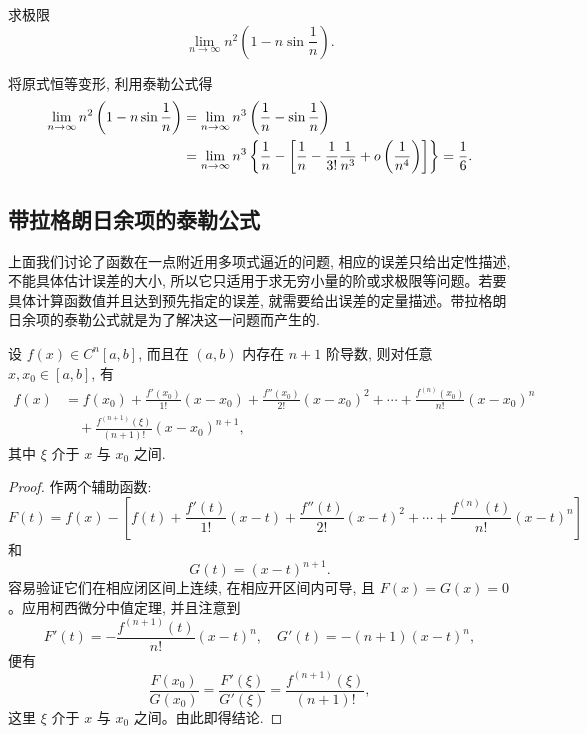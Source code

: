 \begin{example}\label{example:ma-5-3-12}
求极限
\[
  \lim_{n\to\infty}n^2\left(1-n\sin\frac1n\right).
\]
\end{example}


\begin{solve}
将原式恒等变形, 利用泰勒公式得
\[
\begin{aligned}
  \lim_{n\to\infty}n^2\left(1-n\sin\frac1n\right)
  &=
  \lim_{n\to\infty}n^3\left(\frac1n-\sin\frac1n\right) \\
  &=
  \lim_{n\to\infty}n^3
  \left\{
    \frac1n-
    \left[\frac1n-\frac1{3!}\frac1{n^3}+o\left(\frac1{n^4}\right)\right]
  \right\}
  =
  \frac16.
\end{aligned}
\qedhere
\]
\end{solve}


\subsection{带拉格朗日余项的泰勒公式}
\label{subsec:ma-5-3-2}

上面我们讨论了函数在一点附近用多项式逼近的问题, 相应的误差只给出定性描述, 不能具体估计误差的大小, 所以它只适用于求无穷小量的阶或求极限等问题。若要具体计算函数值并且达到预先指定的误差, 就需要给出误差的定量描述。带拉格朗日余项的泰勒公式就是为了解决这一问题而产生的.

\begin{theorem}\label{theorem:ma-5-3-2}
设 $f(x)\in C^n[a,b]$, 而且在 $(a,b)$ 内存在 $n+1$ 阶导数, 则对任意 $x,x_0\in[a,b]$, 有
\begin{equation}
\begin{aligned}
  f(x)
  &=
  f(x_0)+\frac{f'(x_0)}{1!}(x-x_0)+\frac{f''(x_0)}{2!}(x-x_0)^2
  +\cdots+\frac{f^{(n)}(x_0)}{n!}(x-x_0)^n \\
  &\quad+
  \frac{f^{(n+1)}(\xi)}{(n+1)!}(x-x_0)^{n+1},
\end{aligned}
  \label{eq:ma-5-3-2}
\end{equation}
其中 $\xi$ 介于 $x$ 与 $x_0$ 之间.
\end{theorem}


\begin{proof}
作两个辅助函数:
\[
  F(t)=f(x)-\left[
  f(t)+\frac{f'(t)}{1!}(x-t)+\frac{f''(t)}{2!}(x-t)^2
  +\cdots+\frac{f^{(n)}(t)}{n!}(x-t)^n
  \right]
\]
和
\[
  G(t)=(x-t)^{n+1}.
\]
容易验证它们在相应闭区间上连续, 在相应开区间内可导, 且 $F(x)=G(x)=0$。应用柯西微分中值定理, 并且注意到
\[
  F'(t)=-\frac{f^{(n+1)}(t)}{n!}(x-t)^n,\quad
  G'(t)=-(n+1)(x-t)^n,
\]
便有
\[
  \frac{F(x_0)}{G(x_0)}
  =
  \frac{F'(\xi)}{G'(\xi)}
  =
  \frac{f^{(n+1)}(\xi)}{(n+1)!},
\]
这里 $\xi$ 介于 $x$ 与 $x_0$ 之间。由此即得结论.
\end{proof}


